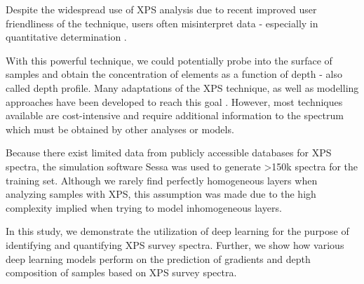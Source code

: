 
Despite the widespread use of XPS analysis due to recent improved user friendliness of the technique, users often misinterpret data - especially in quantitative determination \cite{shard_practical_2020}. 





With this powerful technique, we could potentially probe into the surface of samples and obtain the concentration of elements as a function of depth - also called depth profile. Many adaptations of the XPS technique, as well as modelling approaches have been developed to reach this goal \cite{zemek_non-destructive_2019, zborowski_improved_2022, zborowski_comparison_2022, noauthor_energy_2010}. However, most techniques available are cost-intensive and require additional information to the spectrum which must be obtained by other analyses or models.  




Because there exist limited data from publicly accessible databases for XPS spectra, the simulation software Sessa was used to generate >150k spectra for the training set. Although we rarely find perfectly homogeneous layers when analyzing samples with XPS, this assumption was made due to the high complexity implied when trying to model inhomogeneous layers.


In this study, we demonstrate the utilization of deep learning for the purpose of identifying and quantifying XPS survey spectra. Further, we show how various deep learning models perform on the prediction of gradients and depth composition of samples based on XPS survey spectra.




